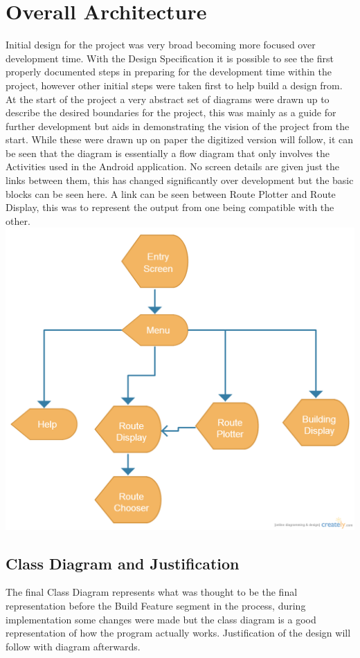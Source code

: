 \section{Overall Architecture}
Initial design for the project was very broad becoming more focused over development time. With the Design Specification it is possible to see the first properly documented steps in preparing for the development time within the project, however other initial steps were taken first to help build a design from. At the start of the project a very abstract set of diagrams were drawn up to describe the desired boundaries for the project, this was mainly as a guide for further development but aids in demonstrating the vision of the project from the start. While these were drawn up on paper the digitized version will follow, it can be seen that the diagram is essentially a flow diagram that only involves the Activities used in the Android application. No screen details are given just the links between them, this has changed significantly over development but the basic blocks can be seen here. A link can be seen between Route Plotter and Route Display, this was to represent the output from one being compatible with the other. \\
\includegraphics[scale=0.4]{Chapter2/screen.png}
\newpage
\subsection{Class Diagram and Justification}
The final Class Diagram represents what was thought to be the final representation before the Build Feature segment in the process, during implementation some changes were made but the class diagram is a good representation of how the program actually works. Justification of the design will follow with diagram afterwards. 

